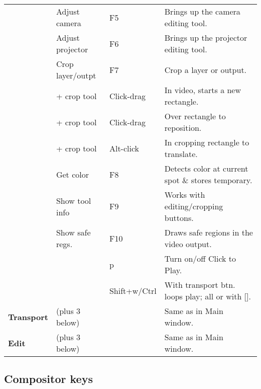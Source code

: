 \begin{longtable}[h]{>{\bfseries}p{}p{}p{}p{}}
  & Adjust camera & F5 & Brings up the camera editing tool. \\
  & Adjust projector & F6 & Brings up the projector editing tool. \\
  & Crop layer/outpt & F7 & Crop a layer or output. \\
  & + crop tool & Click-drag & In video, starts a new rectangle. \\
  &  + crop tool & Click-drag & Over rectangle to reposition. \\
  &  + crop tool & Alt-click & In cropping rectangle to translate. \\
  & Get color & F8 & Detects color at current spot \& stores temporary. \\
  & Show tool info & F9 & Works with editing/cropping buttons. \\
  & Show safe regs. & F10 & Draws safe regions in the video output. \\
  &  & p & Turn on/off Click to Play. \\
  &  & Shift+w/Ctrl & With transport btn. loops play; all or with [\;]. \\
  \midrule
  \textcolor{CinBlueText}{Transport} & (plus 3 below) &  & Same as in Main window. \\
  \midrule
  \textcolor{CinBlueText}{Edit} & (plus 3 below) &  & Same as in Main window. \\
  \bottomrule
\end{longtable}


\subsection*{Compositor keys }%
\label{ssec:compositor_keys}

